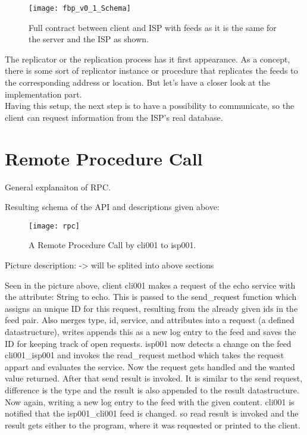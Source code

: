 \begin{figure}
    \centering
    \texttt{[image: fbp\_v0\_1\_Schema]}
    \caption{Full contract between client and ISP with feeds as it is the same for the server and the ISP as shown.}
    \label{fig:contract_cli_isp}
\end{figure}
The replicator or the replication process has it first appearance. As a concept, there is some sort of replicator instance or procedure that replicates the feeds to the corresponding address or location. But let’s have a closer look at the implementation part. \\
Having this setup, the next step is to have a possibility to communicate, so the client can request information from the ISP’s real database.

\pagebreak
\section{Remote Procedure Call}
General explanaiton of RPC.


Resulting schema of the API and descriptions given above:

\begin{figure}
    \centering
    \texttt{[image: rpc]}
    \caption{A Remote Procedure Call by cli001 to isp001.}
    \label{fig:contract_cli_isp}
\end{figure}


Picture description: -> will be splited into above sections

Seen in the picture above, client cli001 makes a request of the echo service with the attribute: String to echo. This is passed to the send\_request function which assigns an unique ID for this request, resulting from the already given ids in the feed pair. Also merges type, id, service, and attributes into a request (a defined datastructure), writes appends this as a new log entry to the feed and saves the ID for keeping track of open requests. isp001 now detects a change on the feed cli001\_isp001 and invokes the read\_request method which takes the request appart and evaluates the service. Now the request gets handled and the wanted value returned. After that send result is invoked. It is similar to the send request, difference is the type and the result is also appended to the result datastructure. Now again, writing a new log entry to the feed with the given content. cli001 is notified that the isp001\_cli001 feed is changed. so read result is invoked and the result gets either to the program, where it was requested or printed to the client.

